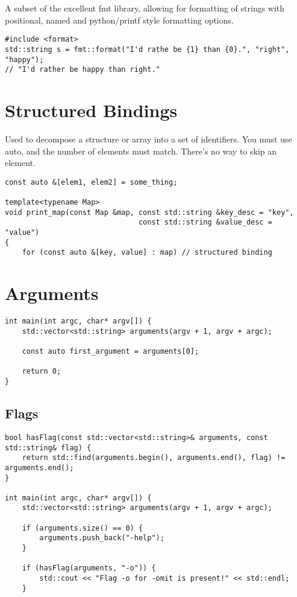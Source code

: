 A subset of the excellent {fmt} library, allowing for formatting of strings with positional,
named and python/printf style formatting options.

\begin{verbatim}
#include <format>
std::string s = fmt::format("I'd rathe be {1} than {0}.", "right", "happy");
// "I'd rather be happy than right."
\end{verbatim}

\section{Structured Bindings}

Used to decompose a structure or array into a set of identifiers.
You must use auto, and the number of elements must match. There's no way to skip an element.

\begin{verbatim}
const auto &[elem1, elem2] = some_thing;

template<typename Map>
void print_map(const Map &map, const std::string &key_desc = "key",
                               const std::string &value_desc = "value")
{
    for (const auto &[key, value] : map) // structured binding
\end{verbatim}

\section{Arguments}

\begin{verbatim}
int main(int argc, char* argv[]) {
    std::vector<std::string> arguments(argv + 1, argv + argc);
    
    const auto first_argument = arguments[0];

    return 0;
}
\end{verbatim}

\subsection{Flags}

\begin{verbatim}
bool hasFlag(const std::vector<std::string>& arguments, const std::string& flag) {
    return std::find(arguments.begin(), arguments.end(), flag) != arguments.end();
}

int main(int argc, char* argv[]) {
    std::vector<std::string> arguments(argv + 1, argv + argc);

    if (arguments.size() == 0) {
        arguments.push_back("-help");
    }

    if (hasFlag(arguments, "-o")) {
        std::cout << "Flag -o for -omit is present!" << std::endl;
    }
\end{verbatim}

